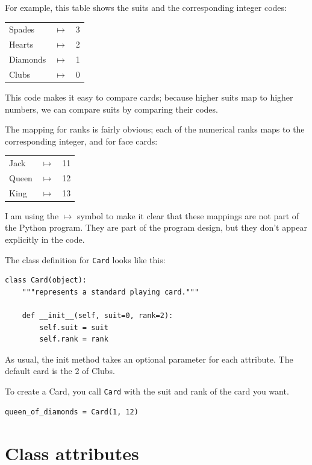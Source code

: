 \documentclass[10pt]{book}
\begin{document}
{For example, this table shows the suits and the corresponding integer
codes:

\beforefig
\begin{tabular}{l c l}
Spades & $\mapsto$ & 3 \\
Hearts & $\mapsto$ & 2 \\
Diamonds & $\mapsto$ & 1 \\
Clubs & $\mapsto$ & 0
\end{tabular}
\afterfig

This code makes it easy to compare cards; because higher suits map to
higher numbers, we can compare suits by comparing their codes.

The mapping for ranks is fairly obvious; each of the numerical ranks
maps to the corresponding integer, and for face cards:

\beforefig
\begin{tabular}{l c l}
Jack & $\mapsto$ & 11 \\
Queen & $\mapsto$ & 12 \\
King & $\mapsto$ & 13 \\
\end{tabular}
\afterfig

I am using the $\mapsto$ symbol to make it clear that these mappings
are not part of the Python program.  They are part of the program
design, but they don't appear explicitly in the code.


The class definition for {\tt Card} looks like this:

\beforeverb
\begin{verbatim}
class Card(object):
    """represents a standard playing card."""

    def __init__(self, suit=0, rank=2):
        self.suit = suit
        self.rank = rank
\end{verbatim}
\afterverb
%
As usual, the init method takes an optional
parameter for each attribute.  The default card is
the 2 of Clubs.


To create a Card, you call {\tt Card} with the
suit and rank of the card you want.

\beforeverb
\begin{verbatim}
queen_of_diamonds = Card(1, 12)
\end{verbatim}
\afterverb
%


\section{Class attributes}

}
\end{document}
